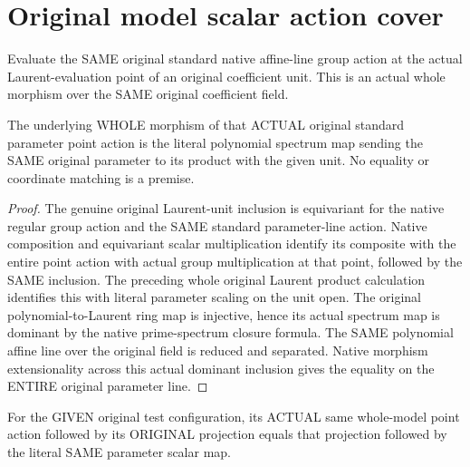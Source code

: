 \section{Original model scalar action cover}
\begin{definition}
\label{def:central-embedding-original-parameter-group-point-action}
\leanok
Evaluate the SAME original standard native affine-line group action at the
actual Laurent-evaluation point of an original coefficient unit. This is an
actual whole morphism over the SAME original coefficient field.
\end{definition}
\begin{theorem}
\label{thm:central-embedding-original-whole-parameter-scalar-action}
\leanok
The underlying WHOLE morphism of that ACTUAL original standard parameter
point action is the literal polynomial spectrum map sending the SAME
original parameter to its product with the given unit. No equality or
coordinate matching is a premise.
\end{theorem}
\begin{proof}
The genuine original Laurent-unit inclusion is equivariant for the native
regular group action and the SAME standard parameter-line action. Native
composition and equivariant scalar multiplication identify its composite
with the entire point action with actual group multiplication at that point,
followed by the SAME inclusion. The preceding whole original Laurent product
calculation identifies this with literal parameter scaling on the unit open.
The original polynomial-to-Laurent ring map is injective, hence its actual
spectrum map is dominant by the native prime-spectrum closure formula. The
SAME polynomial affine line over the original field is reduced and separated.
Native morphism extensionality across this actual dominant inclusion gives
the equality on the ENTIRE original parameter line.
\end{proof}
\begin{theorem}
\label{thm:central-embedding-original-whole-model-scalar-action-triangle}
\leanok
For the GIVEN original test configuration, its ACTUAL same whole-model point
action followed by its ORIGINAL projection equals that projection followed
by the literal SAME parameter scalar map.
\end{theorem}
